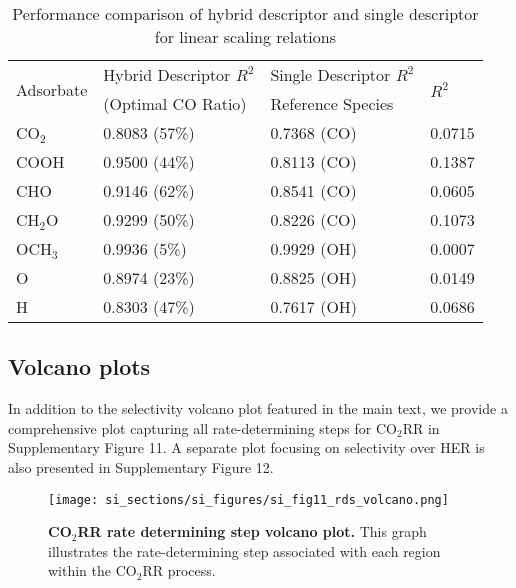 \begin{table}[h]
  \centering
  {\fontsize{10}{12}\selectfont
  \begin{tabular}{*{4}{l}}
    \hline
    \multirow{2}{*}{Adsorbate} & Hybrid Descriptor $R^2$ & Single Descriptor $R^2$ & \multirow{2}{*}{$R^2$} \\
                               & (Optimal CO Ratio)      & Reference Species       &                        \\
    \hline
    CO$_2$    & 0.8083 (57\%)  & 0.7368 (CO)  & 0.0715 \\
    COOH      & 0.9500 (44\%)  & 0.8113 (CO)  & 0.1387 \\
    CHO       & 0.9146 (62\%)  & 0.8541 (CO)  & 0.0605 \\
    CH$_2$O   & 0.9299 (50\%)  & 0.8226 (CO)  & 0.1073 \\
    OCH$_3$   & 0.9936 (5\%)   & 0.9929 (OH)  & 0.0007 \\
    O         & 0.8974 (23\%)  & 0.8825 (OH)  & 0.0149 \\
    H         & 0.8303 (47\%)  & 0.7617 (OH)  & 0.0686 \\
    \hline
  \end{tabular}
  }
  \caption{Performance comparison of hybrid descriptor and single descriptor for linear scaling relations}
  \label{si_table14:hybrid_des_perf}
\end{table}


\subsection{Volcano plots}


In addition to the selectivity volcano plot featured in the main text, we provide a comprehensive plot capturing all rate-determining steps for CO$_2$RR in Supplementary Figure 11. A separate plot focusing on selectivity over HER is also presented in Supplementary Figure 12.


\begin{figure}
  \centering
  \texttt{[image: si\_sections/si\_figures/si\_fig11\_rds\_volcano.png]}
  \caption{\textbf{CO$_2$RR rate determining step volcano plot.}
  This graph illustrates the rate-determining step associated with each region within the CO$_2$RR process.}
  \label{si_fig11:rds_volcano}
\end{figure}


